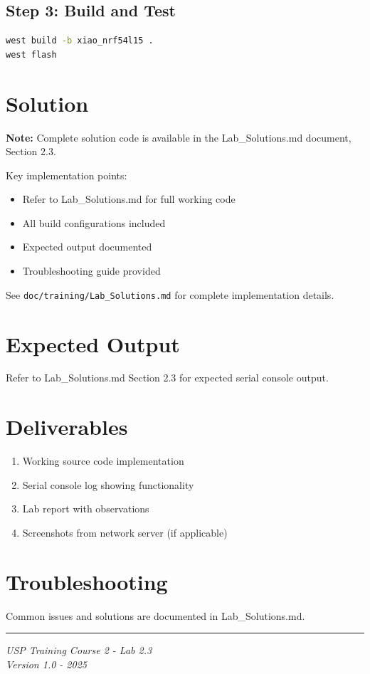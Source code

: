 \documentclass[11pt,a4paper]{article}
\begin{document}
\subsection{Step 3: Build and Test}
\begin{lstlisting}[language=bash]
west build -b xiao_nrf54l15 .
west flash
\end{lstlisting}

\section{Solution}

\begin{solutionbox}
\textbf{Note:} Complete solution code is available in the Lab\_Solutions.md document, Section 2.3.

Key implementation points:
\begin{itemize}
    \item Refer to Lab\_Solutions.md for full working code
    \item All build configurations included
    \item Expected output documented
    \item Troubleshooting guide provided
\end{itemize}

See \texttt{doc/training/Lab\_Solutions.md} for complete implementation details.
\end{solutionbox}

\section{Expected Output}

Refer to Lab\_Solutions.md Section 2.3 for expected serial console output.

\section{Deliverables}

\begin{enumerate}[itemsep=10pt]
    \item Working source code implementation
    \item Serial console log showing functionality
    \item Lab report with observations
    \item Screenshots from network server (if applicable)
\end{enumerate}

\section{Troubleshooting}

Common issues and solutions are documented in Lab\_Solutions.md.

\vfill
\noindent\rule{\textwidth}{0.4pt}
\begin{center}
\textit{USP Training Course 2 - Lab 2.3}\\
\textit{Version 1.0 - 2025}
\end{center}
\end{document}
